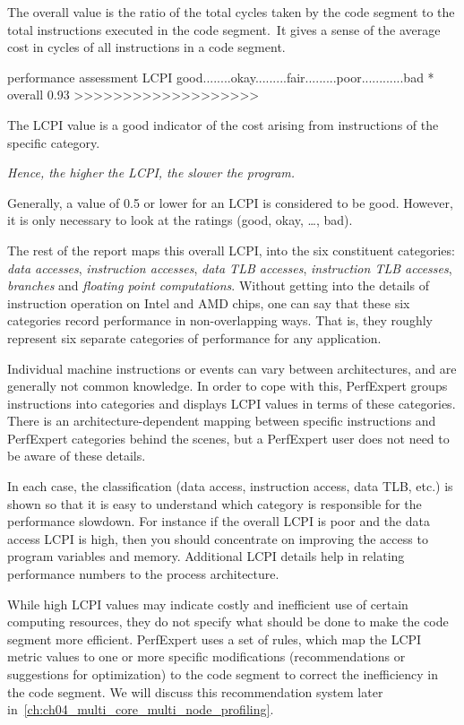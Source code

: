 The overall value is the ratio of the total cycles taken by the code segment to the total instructions executed in the code segment.~It gives a sense of the average cost in cycles of all instructions in a code segment.

\begin{prompt}
performance assessment  LCPI good........okay.........fair.........poor............bad
* overall               0.93 >>>>>>>>>>>>>>>>>>>
\end{prompt}

The LCPI value is a good indicator of the cost arising from instructions of the specific category.

\emph{Hence, the higher the LCPI, the slower the program.}

Generally, a value of 0.5 or lower for an LCPI is considered to be good. However, it is only necessary to look at the ratings (good, okay, \ldots, bad).

The rest of the report maps this overall LCPI, into the six constituent categories: \emph{data accesses}, \emph{instruction accesses}, \emph{data TLB accesses}, \emph{instruction TLB accesses}, \emph{branches} and \emph{floating point computations}. Without getting into the details of instruction operation on Intel and AMD chips, one can say that these six categories record performance in non-overlapping ways. That is, they roughly represent six separate categories of performance for any application.

Individual machine instructions or events can vary between architectures, and are generally not common knowledge. In order to cope with this, PerfExpert groups instructions into categories and displays LCPI values in terms of these categories. There is an architecture-dependent mapping between specific instructions and PerfExpert categories behind the scenes, but a PerfExpert user does not need to be aware of these details.


In each case, the classification (data access, instruction access, data TLB, etc.) is shown so that it is easy to understand which category is responsible for the performance slowdown. For instance if the overall LCPI is poor and the data access LCPI is high, then you should concentrate on improving the access to program variables and memory. Additional LCPI details help in relating performance numbers to the process architecture.

While high LCPI values may indicate costly and inefficient use of certain computing resources, they do not specify what should be done to make the code segment more efficient. PerfExpert uses a set of rules, which map the LCPI metric values to one or more specific modifications (recommendations or suggestions for optimization) to the code segment to correct the inefficiency in the code segment. We will discuss this recommendation system later in~\autoref{ch:ch04_multi_core_multi_node_profiling}.

